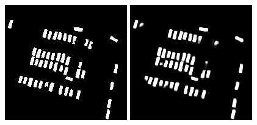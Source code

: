 \documentclass{kththesis}
\begin{document}
\begin{figure}[H]
\centering
{}
  \includegraphics[width=\linewidth]{gan_vs_class/label_1}
\endminipage\hfill
{}
  \includegraphics[width=\linewidth]{gan_vs_class/class_1}
\endminipage\hfill
{}%

\end{figure}
\end{document}
